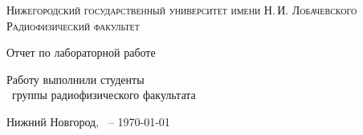 \begin{titlepage}
\begin{center}
{\small\textsc{Нижегородский государственный университет имени Н.\,И. Лобачевского}}
\vskip 2pt \vskip 3pt
{\small\textsc{Радиофизический факультет}}

\vfill


{{\large Отчет по лабораторной работе }\vskip 12pt {\LARGE \bfseries \labtheme}}

	
\vspace{2cm}
{\large Работу выполнили студенты \\[-0.25em] \labgroup\  группы радиофизического факультата \\[0.5em] {\Large \bfseries \labauthors}}



\end{center}

\vfill
	
	
	
\begin{center}
	{Нижний Новгород, \labstartdate\ -- \today}
\end{center}

\end{titlepage}